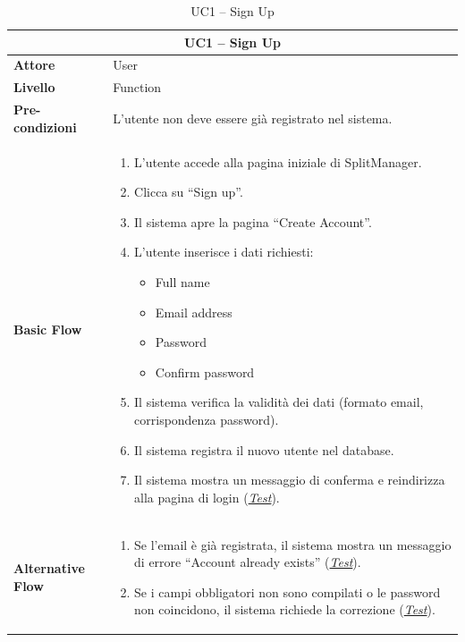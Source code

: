 \begin{table}[htbp]
    \centering
    \footnotesize
    \begin{tabularx}{\textwidth}{|l|X|}
        \hline
        \multicolumn{2}{|c|}{\textbf{UC1 -- Sign Up}} \\
        \hline
        \textbf{Attore} & User \\
        \hline
        \textbf{Livello} & Function \\
        \hline
        \textbf{Pre-condizioni} & L'utente non deve essere già registrato nel sistema. \\
        \hline
        \textbf{Basic Flow} & 
        \begin{enumerate}[leftmargin=*, nosep, topsep=3pt]
            \item L'utente accede alla pagina iniziale di SplitManager.
            \item Clicca su ``Sign up''.
            \item Il sistema apre la pagina ``Create Account''.
            \item L'utente inserisce i dati richiesti:
            \begin{itemize}[nosep, label={--}, topsep=2pt]
                \item Full name
                \item Email address
                \item Password
                \item Confirm password
            \end{itemize}
            \item Il sistema verifica la validità dei dati (formato email, corrispondenza password).
            \item Il sistema registra il nuovo utente nel database.
            \item Il sistema mostra un messaggio di conferma e reindirizza alla pagina di login (\hyperref[test:uc1_signup]{\textit{Test}}).
        \end{enumerate} \\
        \hline
        \textbf{Alternative Flow} & 
        \begin{enumerate}[label=5\alph*., leftmargin=*, nosep, topsep=3pt]
            \item Se l'email è già registrata, il sistema mostra un messaggio di errore ``Account already exists'' (\hyperref[test:uc1_duplicate_email]{\textit{Test}}).
            \item Se i campi obbligatori non sono compilati o le password non coincidono, il sistema richiede la correzione (\hyperref[test:uc1_invalid_input]{\textit{Test}}).
        \end{enumerate} \\
        \hline
    \end{tabularx}
    \caption{UC1 -- Sign Up}
    \label{tab:uc1}
\end{table}

